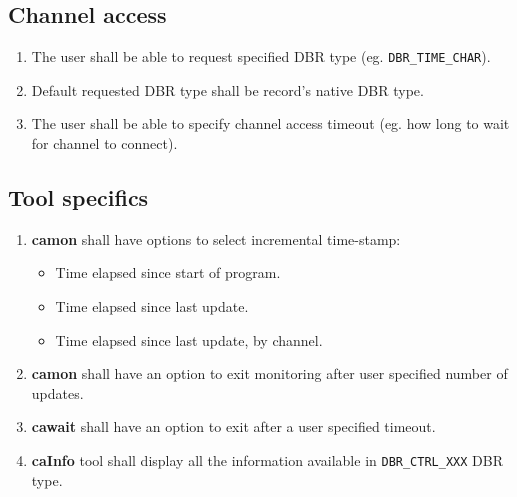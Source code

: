 \documentclass[12pt,a4paper]{article}
\begin{document}
\subsection{Channel access}
\begin{enumerate}
	\item The user shall be able to request specified DBR type (eg. \texttt{DBR\_TIME\_CHAR}).
	\item Default requested DBR type shall be record's native DBR type.
	\item The user shall be able to specify channel access timeout (eg. how long to wait for channel to connect).
\end{enumerate}

\subsection{Tool specifics}
\begin{enumerate}
	\item \textbf{camon} shall have options to select incremental time-stamp:
	\begin{itemize}
		\item Time elapsed since start of program.
		\item Time elapsed since last update.
		\item Time elapsed since last update, by channel.
	\end{itemize}
	\item \textbf{camon} shall have an option to exit monitoring after user specified number of updates.
	\item \textbf{cawait} shall have an option to exit after a user specified timeout.
	\item \textbf{caInfo} tool shall display all the information available in \texttt{DBR\_CTRL\_XXX} DBR type.
\end{enumerate}
\end{document}
